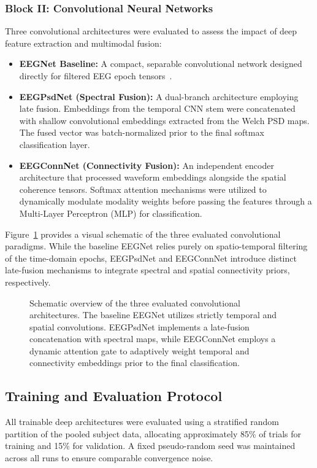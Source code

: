 \subsubsection{Block II: Convolutional Neural Networks}
Three convolutional architectures were evaluated to assess the impact of deep feature extraction and multimodal fusion:
\begin{itemize}
    \item \textbf{EEGNet Baseline:} A compact, separable convolutional network designed directly for filtered EEG epoch tensors~\cite{lawhern2018eegnet}.
    \item \textbf{EEGPsdNet (Spectral Fusion):} A dual-branch architecture employing late fusion. Embeddings from the temporal CNN stem were concatenated with shallow convolutional embeddings extracted from the Welch PSD maps. The fused vector was batch-normalized prior to the final softmax classification layer.
    \item \textbf{EEGConnNet (Connectivity Fusion):} An independent encoder architecture that processed waveform embeddings alongside the spatial coherence tensors. Softmax attention mechanisms were utilized to dynamically modulate modality weights before passing the features through a Multi-Layer Perceptron (MLP) for classification.
\end{itemize}

Figure~\ref{fig:networks} provides a visual schematic of the three evaluated convolutional paradigms. While the baseline EEGNet relies purely on spatio-temporal filtering of the time-domain epochs, EEGPsdNet and EEGConnNet introduce distinct late-fusion mechanisms to integrate spectral and spatial connectivity priors, respectively.

\begin{figure}[htbp]
  \centering
  
  \caption{Schematic overview of the three evaluated convolutional architectures. The baseline EEGNet utilizes strictly temporal and spatial convolutions. EEGPsdNet implements a late-fusion concatenation with spectral maps, while EEGConnNet employs a dynamic attention gate to adaptively weight temporal and connectivity embeddings prior to the final classification.}
  \label{fig:networks}
\end{figure}

\subsection{Training and Evaluation Protocol}
\label{sec:training}
All trainable deep architectures were evaluated using a stratified random partition of the pooled subject data, allocating approximately 85\% of trials for training and 15\% for validation. A fixed pseudo-random seed was maintained across all runs to ensure comparable convergence noise. 

